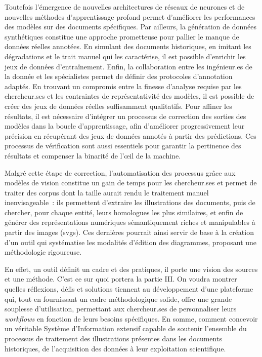 \documentclass[a4paper,12pt,twoside]{book}
\newcommand{\svgs}{\gls{svg}s\xspace}
\begin{document}
Toutefois l'émergence de nouvelles architectures de réseaux de neurones
et de nouvelles méthodes d'apprentissage profond permet d'améliorer les
performances des modèles sur des documents spécifiques. Par ailleurs, la
génération de données synthétiques constitue une approche prometteuse
pour pallier le manque de données réelles annotées. En simulant des
documents historiques, en imitant les dégradations et le trait manuel qui
les caractérise, il est possible d'enrichir les jeux de données
d'entraînement. Enfin, la collaboration entre les ingénieur.es de la
donnée et les spécialistes permet de définir des protocoles d'annotation
adaptés. En trouvant un compromis entre la finesse d'analyse requise par
les chercheur.ses et les contraintes de représentativité des modèles, il
est possible de créer des jeux de données réelles suffisamment
qualitatifs. Pour affiner les résultats, il est nécessaire d'intégrer un
processus de correction des sorties des modèles dans la boucle
d'apprentissage, afin d'améliorer progressivement leur précision en
récupérant des jeux de données annotés à partir des prédictions. Ces
processus de vérification sont aussi essentiels pour garantir la
pertinence des résultats et compenser la binarité de l'œil de la
machine.

Malgré cette étape de correction, l'automatisation des processus grâce
aux modèles de vision constitue un gain de temps pour les chercheur.ses et
permet de traiter des corpus dont la taille aurait rendu le traitement
manuel inenvisageable~: ils permettent d'extraire les illustrations des
documents, puis de chercher, pour chaque entité, leurs homologues les
plus similaires, et enfin de générer des représentations numériques
sémantiquement riches et manipulables à partir des images (\svgs). Ces
dernières pourrait ainsi servir de base à la création d'un outil qui
systématise les modalités d'édition des diagrammes, proposant une
méthodologie rigoureuse.

En effet, un outil définit un cadre et des pratiques, il porte une
vision des sources et une méthode. C'est ce sur quoi portera la partie
III. On voudra montrer quelles réflexions, défis et solutions tiennent
au développement d'une plateforme qui, tout en fournissant un cadre
méthodologique solide, offre une grande souplesse d'utilisation,
permettant aux chercheur.ses de personnaliser leurs \textit{workflows} en fonction de
leurs besoins spécifiques. En somme, comment concevoir un véritable
Système d'Information extensif capable de soutenir l'ensemble du
processus de traitement des illustrations présentes dans les documents
historiques, de l'acquisition des données à leur exploitation
scientifique.
\end{document}
